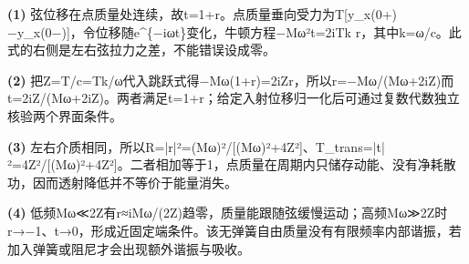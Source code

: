 \par\noindent\textbf{(1)} 弦位移在点质量处连续，故t=1+r。点质量垂向受力为T[y\_x(0+)−y\_x(0−)]，令位移随e\textasciicircum{}\{−iωt\}变化，牛顿方程−Mω²t=2iTk r，其中k=ω/c。此式的右侧是左右弦拉力之差，不能错误设成零。
\par\noindent\textbf{(2)} 把Z=T/c=Tk/ω代入跳跃式得−Mω(1+r)=2iZr，所以r=−Mω/(Mω+2iZ)而t=2iZ/(Mω+2iZ)。两者满足t=1+r；给定入射位移归一化后可通过复数代数独立核验两个界面条件。
\par\noindent\textbf{(3)} 左右介质相同，所以R=|r|²=(Mω)²/[(Mω)²+4Z²]、T\_trans=|t|²=4Z²/[(Mω)²+4Z²]。二者相加等于1，点质量在周期内只储存动能、没有净耗散功，因而透射降低并不等价于能量消失。
\par\noindent\textbf{(4)} 低频Mω≪2Z有r≈iMω/(2Z)趋零，质量能跟随弦缓慢运动；高频Mω≫2Z时r→−1、t→0，形成近固定端条件。该无弹簧自由质量没有有限频率内部谐振，若加入弹簧或阻尼才会出现额外谐振与吸收。
